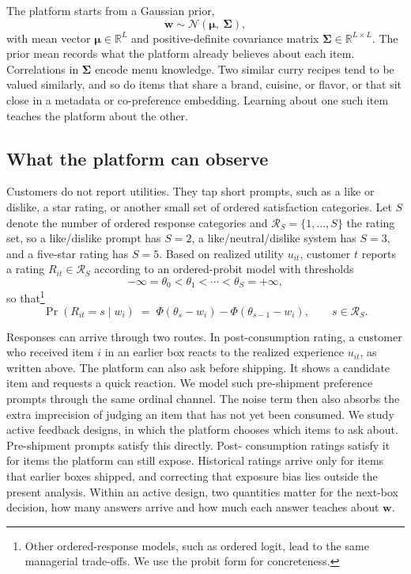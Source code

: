 \documentclass[11pt]{article}
\theoremstyle{definition}
\theoremstyle{remark}
\newcommand{\1}{\mathbf{1}}
\newcommand{\bmu}{\boldsymbol{\mu}}
\newcommand{\bSigma}{\boldsymbol{\Sigma}}
\newcommand{\cR}{\mathcal{R}}
\begin{document}
The platform starts from a Gaussian prior,
\[
\mathbf w \sim \mathcal N(\bmu,\ \bSigma),
\]
with mean vector $\bmu \in \mathbb R^L$ and positive-definite
covariance matrix $\bSigma \in \mathbb R^{L \times L}$. The prior mean
records what the platform already believes about each item.
Correlations in $\bSigma$ encode menu knowledge. Two similar curry
recipes tend to be valued similarly, and so do items that share a
brand, cuisine, or flavor, or that sit close in a metadata or
co-preference embedding. Learning about one such item teaches the
platform about the other.

\subsection{What the platform can observe}\label{subsec:estimator}

Customers do not report utilities. They tap short prompts, such as a like or dislike, a star rating, or another small set of ordered satisfaction
categories. Let \(S\) denote the number of ordered response categories
and \(\cR_S=\{1,\ldots,S\}\) the rating set, so a like/dislike prompt
has \(S=2\), a like/neutral/dislike system has \(S=3\), and a
five-star rating has \(S=5\). Based on realized utility \(u_{it}\),
customer \(t\) reports a rating \(R_{it}\in\cR_S\) according to an
ordered-probit model with thresholds
\[
-\infty = \theta_0 < \theta_1 < \cdots < \theta_S = +\infty,
\]
so that\footnote{Other ordered-response
models, such as ordered logit, lead to the same managerial trade-offs.
We use the probit form for concreteness.}
\[
\Pr(R_{it} = s \mid w_i)
\;=\;
\Phi(\theta_s - w_i) - \Phi(\theta_{s-1} - w_i),
\qquad s \in \cR_S.
\]

Responses can arrive through two routes. In post-consumption rating, a
customer who received item \(i\) in an earlier box reacts to the
realized experience \(u_{it}\), as written above. The platform can also ask before shipping. It shows a candidate item and
requests a quick reaction. We model such pre-shipment preference prompts through the
same ordinal channel. The noise term then also absorbs the extra
imprecision of judging an item that has not yet been consumed. We study active feedback designs, in which the platform chooses which
items to ask about. Pre-shipment prompts satisfy this directly. Post-
consumption ratings satisfy it for items the platform can still expose.
Historical ratings arrive only for items that earlier boxes shipped, and
correcting that exposure bias lies outside the present analysis. Within
an active design, two quantities matter for the next-box decision, how
many answers arrive and how much each answer teaches about \(\mathbf
w\).
\end{document}
